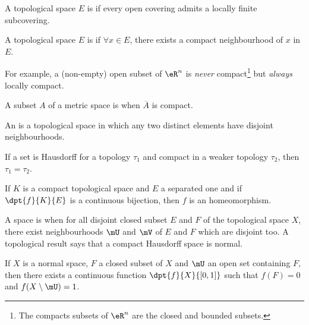 \begin{definition}	\label{DefParacompact}
A topological space $E$ is  if every open covering admits a locally finite subcovering.
\end{definition}


\begin{definition}
A topological space $E$ is  if $\forall x\in E$, there exists a compact neighbourhood of $x$ in $E$.
\end{definition}

For example, a (non-empty) open subset of $\eR^n$ is \emph{never} compact\footnote{The compacts subsets of $\eR^n$ are the closed and bounded subsets.} but \emph{always} locally compact.

\begin{definition}
A subset $A$ of a metric space is  when $\overline{A}$ is compact.
\end{definition}

\begin{definition}
An  is a topological space in which any two distinct elements have disjoint neighbourhoods.
\end{definition}

\begin{lemma}
If a set is Hausdorff for a topology $\tau_1$ and compact in a weaker topology $\tau_2$, then $\tau_1=\tau_2$.\label{lem:Hausweak}
\end{lemma}

\begin{proposition}
If $K$ is a compact topological space and $E$ a separated one and if $\dpt{f}{K}{E}$ is a continuous bijection, then $f$ is an homeomorphism. \label{lem:wiki}
\end{proposition}

A space is  when for all disjoint closed subset $E$ and $F$ of the topological space $X$, there exist neighbourhoods $\mU$ and $\mV$ of $E$ and $F$ which are disjoint too. A topological result says that a compact Hausdorff space is normal.

\begin{lemma}\label{lem:Urysohn}
If $X$ is a normal space, $F$ a closed subset of $X$ and $\mU$ an open set containing $F$, then there exists a continuous function $\dpt{f}{X}{[0,1]}$ such that $f(F)=0$ and $f(X\setminus\mU)=1$. 
\end{lemma}

